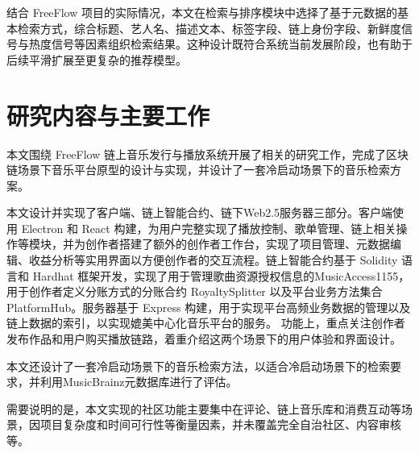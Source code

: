 结合 FreeFlow 项目的实际情况，本文在检索与排序模块中选择了基于元数据的基本检索方式，综合标题、艺人名、描述文本、标签字段、链上身份字段、新鲜度信号与热度信号等因素组织检索结果。这种设计既符合系统当前发展阶段，也有助于后续平滑扩展至更复杂的推荐模型。


\section{研究内容与主要工作}

本文围绕 FreeFlow 链上音乐发行与播放系统开展了相关的研究工作，完成了区块链场景下音乐平台原型的设计与实现，并设计了一套冷启动场景下的音乐检索方案。

本文设计并实现了客户端、链上智能合约、链下Web2.5服务器三部分。客户端使用 Electron 和 React 构建，为用户完整实现了播放控制、歌单管理、链上相关操作等模块，并为创作者搭建了额外的创作者工作台，实现了项目管理、元数据编辑、收益分析等实用界面以方便创作者的交互流程。链上智能合约基于 Solidity 语言和 Hardhat 框架开发，实现了用于管理歌曲资源授权信息的MusicAccess1155，用于创作者定义分账方式的分账合约 RoyaltySplitter 以及平台业务方法集合PlatformHub。服务器基于 Express 构建，用于实现平台高频业务数据的管理以及链上数据的索引，以实现媲美中心化音乐平台的服务。
功能上，重点关注创作者发布作品和用户购买播放链路，着重介绍这两个场景下的用户体验和界面设计。

本文还设计了一套冷启动场景下的音乐检索方法，以适合冷启动场景下的检索要求，并利用MusicBrainz元数据库进行了评估。

需要说明的是，本文实现的社区功能主要集中在评论、链上音乐库和消费互动等场景，因项目复杂度和时间可行性等衡量因素，并未覆盖完全自治社区、内容审核等。







